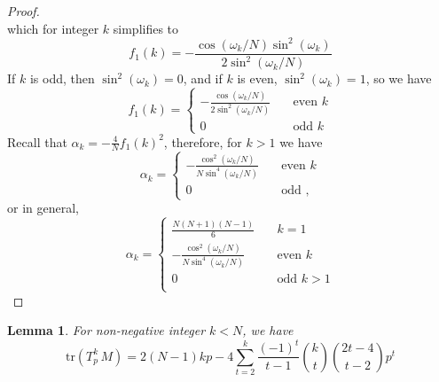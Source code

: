 \documentclass[12pt]{article}
\newtheorem{lemma}{Lemma}
\theoremstyle{definition}
\begin{document}
\begin{proof}
\[    \]
    which for integer $k$ simplifies to
    \[
    f_1(k) = - \frac{\cos\left(\omega_k/N\right) \sin^{2}\left(\omega_k\right)}{2\sin^{2}\left(\omega_k/N\right)}
    \]
    If $k$ is odd, then $\sin^{2}\left(\omega_k\right) = 0$, and if $k$ is even, $\sin^{2}\left(\omega_k\right) = 1$, so we have 
    \[
f_1(k) = 
\begin{cases}
    - \frac{\cos\left(\omega_k/N\right)}{2\sin^{2}\left(\omega_k/N\right)}&\quad \text{even } k\\
    0 &\quad \text{odd } k
\end{cases}
\]
Recall that $\alpha_k = -\frac{4}{N}f_1(k)^2$, therefore, for $k > 1$ we have 
\[
\alpha_k = 
\begin{cases}
    -\frac{\cos^2\left(\omega_k/N\right)}{N\sin^4\left(\omega_k/N\right)}&\quad \text{even } k\\
    0 &\quad \text{odd },
\end{cases}
\]
or in general,
\[
\alpha_k = 
\begin{cases}
    \frac{N(N+1)(N-1)}{6} &\quad k = 1\\
    -\frac{\cos^2\left(\omega_k/N\right)}{N\sin^4\left(\omega_k/N\right)}&\quad \text{even } k\\
    0 &\quad \text{odd } k>1\\
\end{cases}
\]
\end{proof}
\begin{lemma}
    For non-negative integer $k < N$, we have 
    \[
\mathrm{tr }(T_p^k\,M) =  2(N-1)kp -4\sum_{t=2}^k\frac{(-1)^t}{t-1}\binom{k}{t} \binom{2t-4}{t-2}p^t
\] 
\end{lemma}
\end{document}
